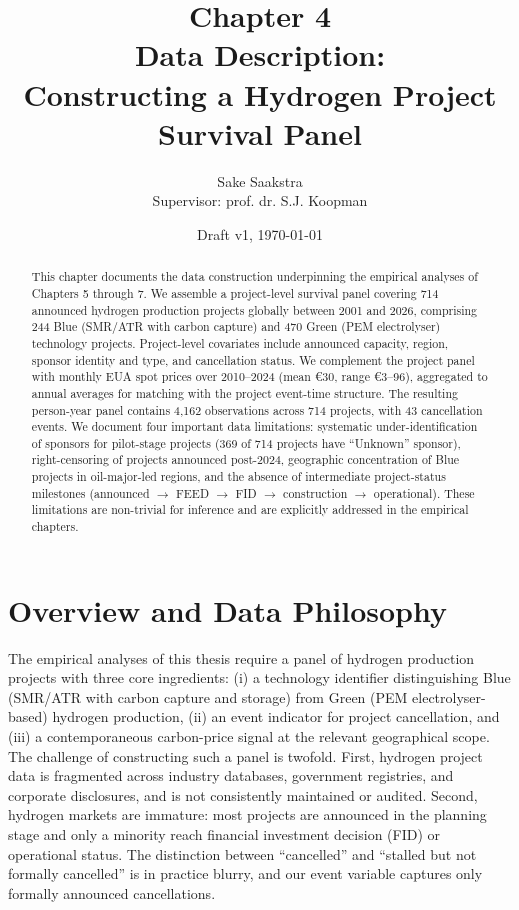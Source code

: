 \documentclass[11pt,a4paper]{article}
\title{\textbf{Chapter 4}\\[0.3em] Data Description:\\
Constructing a Hydrogen Project Survival Panel}
\author{Sake Saakstra \\ \small Supervisor: prof. dr. S.J. Koopman}
\date{Draft v1, \today}
\begin{document}
\maketitle

\begin{abstract}
This chapter documents the data construction underpinning the empirical analyses of Chapters 5 through 7. We assemble a project-level survival panel covering 714 announced hydrogen production projects globally between 2001 and 2026, comprising 244 Blue (SMR/ATR with carbon capture) and 470 Green (PEM electrolyser) technology projects. Project-level covariates include announced capacity, region, sponsor identity and type, and cancellation status. We complement the project panel with monthly EUA spot prices over 2010--2024 (mean \euro 30, range \euro 3--96), aggregated to annual averages for matching with the project event-time structure. The resulting person-year panel contains 4{,}162 observations across 714 projects, with 43 cancellation events. We document four important data limitations: systematic under-identification of sponsors for pilot-stage projects (369 of 714 projects have ``Unknown'' sponsor), right-censoring of projects announced post-2024, geographic concentration of Blue projects in oil-major-led regions, and the absence of intermediate project-status milestones (announced $\to$ FEED $\to$ FID $\to$ construction $\to$ operational). These limitations are non-trivial for inference and are explicitly addressed in the empirical chapters.
\end{abstract}

\section{Overview and Data Philosophy}
\label{sec:ch4-overview}

The empirical analyses of this thesis require a panel of hydrogen production projects with three core ingredients: (i) a technology identifier distinguishing Blue (SMR/ATR with carbon capture and storage) from Green (PEM electrolyser-based) hydrogen production, (ii) an event indicator for project cancellation, and (iii) a contemporaneous carbon-price signal at the relevant geographical scope. The challenge of constructing such a panel is twofold. First, hydrogen project data is fragmented across industry databases, government registries, and corporate disclosures, and is not consistently maintained or audited. Second, hydrogen markets are immature: most projects are announced in the planning stage and only a minority reach financial investment decision (FID) or operational status. The distinction between ``cancelled'' and ``stalled but not formally cancelled'' is in practice blurry, and our event variable captures only formally announced cancellations.
\end{document}
